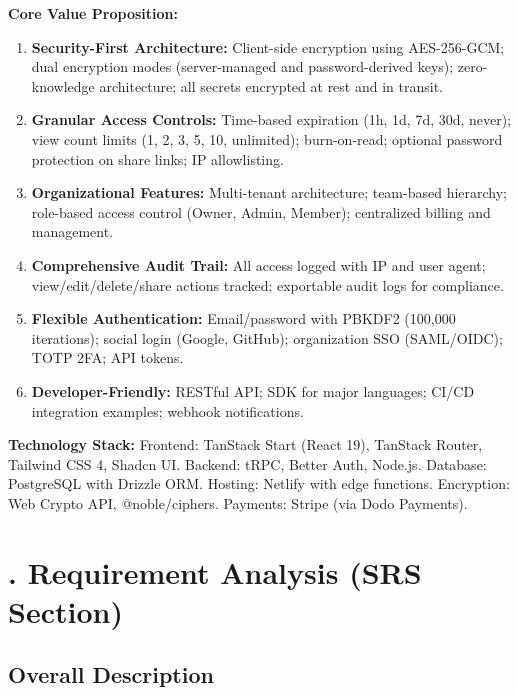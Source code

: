 \documentclass[12pt,a4paper]{article}
\begin{document}
\textbf{Core Value Proposition:}
\begin{enumerate}[leftmargin=*]
  \item \textbf{Security-First Architecture:} Client-side encryption using AES-256-GCM; dual encryption modes (server-managed and password-derived keys); zero-knowledge architecture; all secrets encrypted at rest and in transit.
  \item \textbf{Granular Access Controls:} Time-based expiration (1h, 1d, 7d, 30d, never); view count limits (1, 2, 3, 5, 10, unlimited); burn-on-read; optional password protection on share links; IP allowlisting.
  \item \textbf{Organizational Features:} Multi-tenant architecture; team-based hierarchy; role-based access control (Owner, Admin, Member); centralized billing and management.
  \item \textbf{Comprehensive Audit Trail:} All access logged with IP and user agent; view/edit/delete/share actions tracked; exportable audit logs for compliance.
  \item \textbf{Flexible Authentication:} Email/password with PBKDF2 (100,000 iterations); social login (Google, GitHub); organization SSO (SAML/OIDC); TOTP 2FA; API tokens.
  \item \textbf{Developer-Friendly:} RESTful API; SDK for major languages; CI/CD integration examples; webhook notifications.
\end{enumerate}

\textbf{Technology Stack:} Frontend: TanStack Start (React 19), TanStack Router, Tailwind CSS 4, Shadcn UI. Backend: tRPC, Better Auth, Node.js. Database: PostgreSQL with Drizzle ORM. Hosting: Netlify with edge functions. Encryption: Web Crypto API, @noble/ciphers. Payments: Stripe (via Dodo Payments).

\section*{\fontsize{16pt}{1.2}. Requirement Analysis (SRS Section)}

\subsection*{\fontsize{14pt}{1.2} Overall Description}
\end{document}
